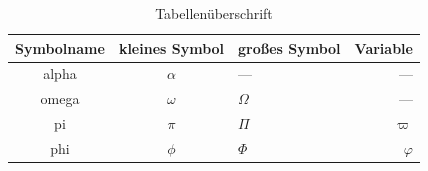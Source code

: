 \begin{table}[ht]
    \centering
    \caption{Tabellenüberschrift}
    \label{tab:Label}
    \begin{tabular}{c|c|l|r}
        Symbolname  & kleines Symbol    & großes Symbol & Variable\\
        \hline
        alpha       & $\alpha$          & ---           & ---\\
        omega       & $\omega$          & $\Omega$      & ---\\
        pi          & $\pi$             & $\Pi$         & $\varpi$\\
        phi         & $\phi$            & $\Phi$        & $\varphi$\\
    \end{tabular}
\end{table}
